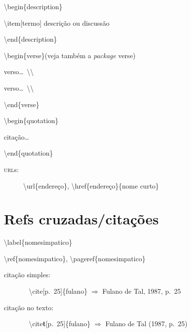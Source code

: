 \documentclass[10pt,twoside,english,brazilian]{article}
\begin{document}
\begin{multicols}{3}
\textbackslash{}begin\{description\}

\quad\textbackslash{}item[termo] descrição ou discussão

\textbackslash{}end\{description\}


\vspace{\baselineskip}


\textbackslash{}begin\{verse\}\quad (veja também a \textit{package} \textsf{verse})

\quad verso\dots\ \textbackslash\textbackslash

\quad verso\dots\ \textbackslash\textbackslash

\textbackslash{}end\{verse\}


\vspace{\baselineskip}


\textbackslash{}begin\{quotation\}

\quad citação\dots

\textbackslash{}end\{quotation\}


\vspace{\baselineskip}


\begin{description}
    \item[\textsc{url}s:] \textbackslash{}url\{endereço\},
        \textbackslash{}href\{endereço\}\{nome curto\}
\end{description}

\section*{Refs cruzadas/citações}

\textbackslash{}label\{nomesimpatico\}

\textbackslash{}ref\{nomesimpatico\},
\textbackslash{}pageref\{nomesimpatico\}


\vspace{\baselineskip}


\begin{description}
\item[citação simples:]~\vspace{2pt}\newline
    \null\quad\textbackslash{}cite[p.~25]\{fulano\} $\Rightarrow$ Fulano de Tal, 1987, p.~25\vspace{6pt}

  \item[citação no texto:]~\vspace{2pt}\newline
    \null\quad\textbackslash{}cite\textbf{t}[p.~25]\{fulano\} $\Rightarrow$ Fulano de Tal (1987, p.~25)\vspace{6pt}


\end{description}
\end{multicols}
\end{document}
